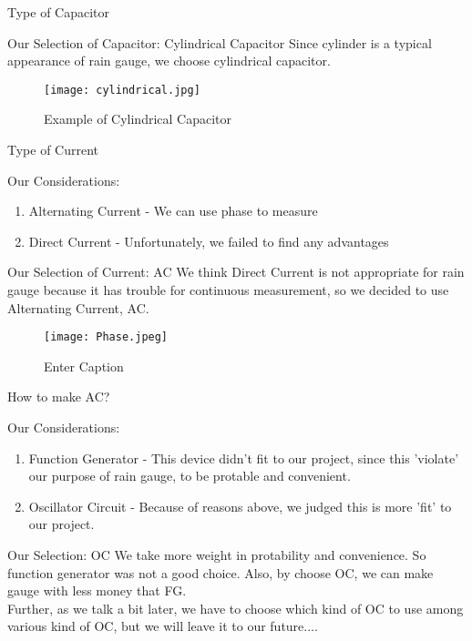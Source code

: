 \documentclass{beamer}
\begin{document}
\begin{frame}{Type of Capacitor}
    \begin{block}{Our Selection of Capacitor: Cylindrical Capacitor}
        Since cylinder is a typical appearance of rain gauge, we choose cylindrical capacitor.
    \end{block}
    \begin{figure}
        \centering
        \texttt{[image: cylindrical.jpg]}
        \caption{Example of Cylindrical Capacitor}
        \label{fig:enter-label}
    \end{figure}
\end{frame}

\begin{frame}{Type of Current}
    \begin{block}{Our Considerations:}
        \begin{enumerate}
            \item Alternating Current - We can use phase to measure
            \item Direct Current - Unfortunately, we failed to find any advantages
        \end{enumerate}
    \end{block}
    \begin{block}{Our Selection of Current: AC}
        We think Direct Current is not appropriate for rain gauge because it has trouble for continuous measurement, so we decided to use Alternating Current, AC.
    \end{block}
    \begin{figure}
        \centering
        \texttt{[image: Phase.jpeg]}
        \caption{Enter Caption}
        \label{fig:enter-label}
    \end{figure}
\end{frame}

\begin{frame}{How to make AC?}
    \begin{block}{Our Considerations:}
        \begin{enumerate}
            \item Function Generator - This device didn't fit to our project, since this 'violate' our purpose of rain gauge, to be protable and convenient.
            \item Oscillator Circuit - Because of reasons above, we judged this is more 'fit' to our project.
        \end{enumerate}
    \end{block}
    \begin{block}{Our Selection: OC}
        We take more weight in protability and convenience. So function generator was not a good choice. Also, by choose OC, we can make gauge with less money that FG. \\
        Further, as we talk a bit later, we have to choose which kind of OC to use among various kind of OC, but we will leave it to our future....
    \end{block}
\end{frame}
\end{document}
